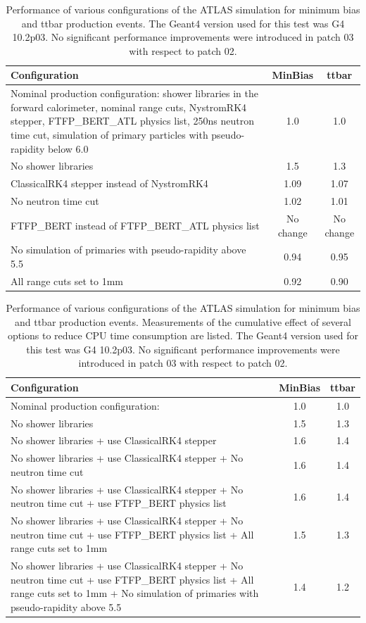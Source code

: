 \documentclass[12pt,a4paper]{article}
\begin{document}
{\begin{table}[bhp]
\centering
\begin{tabular}{| p{9cm} | c | c |}
\hline
Configuration & MinBias & ttbar \\ \hline
Nominal production configuration: shower libraries 
in the forward calorimeter, nominal range cuts, 
NystromRK4 stepper, FTFP\_BERT\_ATL
physics list, 250ns neutron time cut, simulation 
of primary particles with pseudo-rapidity below 6.0
 & 1.0 & 1.0 \\ \hline
No shower libraries & 1.5 & 1.3 \\ \hline
ClassicalRK4 stepper instead of NystromRK4 & 1.09 & 1.07 \\ \hline
No neutron time cut & 1.02 & 1.01 \\ \hline
FTFP\_BERT instead of FTFP\_BERT\_ATL physics list & No change & No
change \\ \hline
No simulation of primaries with pseudo-rapidity above 5.5 & 0.94 & 0.95
\\ \hline
All range cuts set to 1mm & 0.92 & 0.90 \\ \hline
\end{tabular}
\caption{Performance of various configurations of the ATLAS
simulation for minimum bias and ttbar production events. The Geant4
version used for this test was G4 10.2p03. No significant performance
improvements were introduced in patch 03 with respect to patch 02.}
\label{table:table4}
\end{table}

\begin{table}[bthp]
\centering
\begin{tabular}{| p{9cm} | c | c |}
\hline
Configuration & MinBias & ttbar \\ \hline
Nominal production configuration: & 1.0 & 1.0 \\ \hline
No shower libraries & 1.5 & 1.3 \\ \hline
No shower libraries + use ClassicalRK4 stepper & 1.6 & 1.4 \\ \hline
No shower libraries + use ClassicalRK4 stepper + No neutron time cut &
1.6 & 1.4 \\ \hline
No shower libraries + use ClassicalRK4 stepper + No neutron time cut +
use FTFP\_BERT physics list & 1.6 & 1.4 \\ \hline
No shower libraries + use ClassicalRK4 stepper + No neutron time cut +
use FTFP\_BERT physics list + All range cuts set to 1mm & 1.5 & 1.3
\\ \hline
No shower libraries + use ClassicalRK4 stepper + No neutron time cut +
use FTFP\_BERT physics list + All range cuts set to 1mm + No simulation
of primaries with pseudo-rapidity above 5.5 & 1.4 & 1.2 \\ \hline
\end{tabular}
\caption{Performance of various configurations of the ATLAS
simulation for minimum bias and ttbar production events. Measurements of
the cumulative effect of several options to reduce CPU time consumption
are listed. The Geant4 version used for this test was G4 10.2p03. No
significant performance improvements were introduced in patch 03 with
respect to patch 02.}
\label{table:table5}
\end{table}

}
\end{document}
